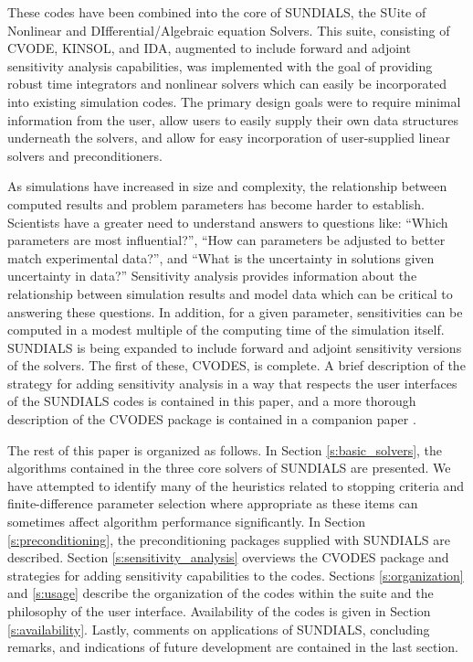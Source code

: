 These codes have been combined into the core of SUNDIALS, the  
SUite of Nonlinear and DIfferential/Algebraic equation Solvers.  
This suite, consisting of CVODE, KINSOL, and IDA, augmented to include
forward and adjoint sensitivity 
analysis capabilities, was implemented with the goal of providing
robust time integrators and nonlinear solvers which can easily be 
incorporated into existing simulation codes.  The primary design 
goals were to require minimal information from the user, allow users 
to easily supply their own data structures underneath the solvers, 
and allow for easy incorporation of user-supplied linear solvers
and preconditioners.

As simulations have increased in size and complexity, the 
relationship between computed results and problem parameters has 
become harder to establish.  Scientists have a greater need to
understand answers to questions like: ``Which parameters are 
most influential?'', ``How can parameters be adjusted to better 
match experimental data?'', and ``What is the uncertainty in solutions 
given uncertainty in data?''  Sensitivity analysis provides 
information about the relationship between simulation results and model 
data which can be critical to answering these questions.  In addition, for 
a given parameter, sensitivities can be computed in a modest multiple of 
the computing time of the simulation itself.  
SUNDIALS is being expanded to 
include forward and adjoint sensitivity versions of the solvers.
The first of these, CVODES, is complete.  A brief description of the
strategy for adding sensitivity analysis in a way that respects the
user interfaces of the SUNDIALS codes is contained in this paper, and 
a more thorough description of the CVODES package is contained in a 
companion paper \cite{SeHi:03}.

The rest of this paper is organized as follows.  In Section 
\ref{s:basic_solvers}, the algorithms contained in the three 
core solvers of SUNDIALS are presented.  
We have attempted to identify many of the heuristics related to 
stopping criteria and finite-difference parameter selection
where appropriate as these items 
can sometimes affect algorithm performance significantly.
In Section \ref{s:preconditioning}, the
preconditioning packages supplied with SUNDIALS are
described.  Section \ref{s:sensitivity_analysis} overviews
the CVODES package and strategies for adding sensitivity 
capabilities to the codes.  Sections \ref{s:organization} and 
\ref{s:usage} describe the organization of the codes within the 
suite and the philosophy of the user interface.   
Availability of the codes is given in 
Section \ref{s:availability}.  Lastly, comments on 
applications of SUNDIALS, concluding remarks, and indications 
of future development
are contained in the last section.



